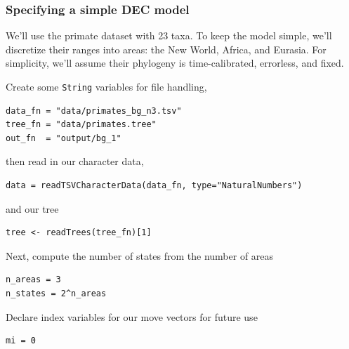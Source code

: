 \subsubsection{Specifying a simple DEC model}

We'll use the primate dataset with 23 taxa. To keep the model simple, we'll discretize their ranges into areas: the New World, Africa, and Eurasia.
For simplicity, we'll assume their phylogeny is time-calibrated, errorless, and fixed.

%

Create some {\tt String} variables for file handling,
\begin{snugshade}
\begin{lstlisting}
data_fn = "data/primates_bg_n3.tsv"
tree_fn = "data/primates.tree"
out_fn  = "output/bg_1"
\end{lstlisting}
\end{snugshade}

then read in our character data,

\begin{snugshade}
\begin{lstlisting}
data = readTSVCharacterData(data_fn, type="NaturalNumbers")
\end{lstlisting}
\end{snugshade}

and our tree

\begin{snugshade}
\begin{lstlisting}
tree <- readTrees(tree_fn)[1]
\end{lstlisting}
\end{snugshade}

Next, compute the number of states from the number of areas

\begin{snugshade}
\begin{lstlisting}
n_areas = 3
n_states = 2^n_areas
\end{lstlisting}
\end{snugshade}

Declare index variables for our move vectors for future use

\begin{snugshade}
\begin{lstlisting}
mi = 0
\end{lstlisting}
\end{snugshade}

